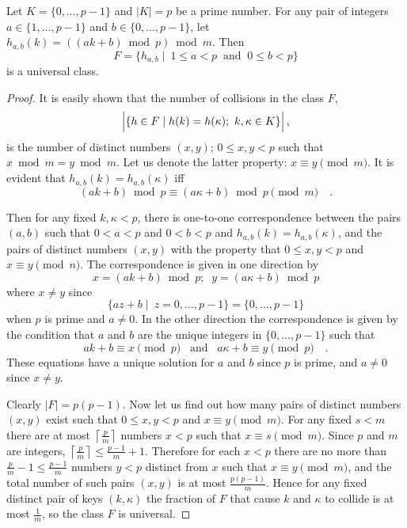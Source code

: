 \begin{Theorem} 
\label{the:ucf}
Let \({K}=\{0,\ldots,p-1\}\) and \(|{K}| = p\) be
a prime number. 
For any pair of integers \(a \in \{1, \ldots, p-1\}\)
and \(b \in \{0, \ldots, p-1\}\), let
\(
h_{a,b}(k) = \left ( (ak + b) \bmod p \right ) \bmod m
\).
Then
\[
{F} = \{h_{a,b} \mid \ 1 \le a < p \;\; \mathrm{and} \;\; 0 \le b < p \}
\]
is a universal class.
\end{Theorem}
\begin{proof}
It is easily shown that the number of collisions in the
class \({F}\), 
\[
\left| \raisebox{10pt}{} \{h\in {F} \mid  h(k)= h(\kappa); \ k,\kappa\in {K}\}\right|,
\]
is the number of distinct numbers \((x,y)\);
\(0 \le x,y < p\) such that 
\(x \bmod m = y \bmod m\). Let us denote the latter property: 
\(x \equiv y \pmod m\). %
It is evident that \(h_{a,b}(k) = h_{a,b}(\kappa)\) iff 
\[
(ak + b ) \bmod p  \equiv 
(a\kappa + b ) \bmod p  \pmod m \quad .
\]

Then for any fixed \(k, \kappa < p\), there is one-to-one
correspondence between the pairs \((a,b)\) such that
\(0 < a < p\) and \(0 < b < p\) and \(h_{a,b}(k) = h_{a,b}(\kappa)\),
and the pairs of distinct numbers \((x,y)\) with the
property that \(0 \le x,y < p\) and \(x \equiv y \pmod n\).
The correspondence is given in one direction by
\[
x = (ak + b) \bmod p; \;\; y = (a\kappa + b) \bmod p
\]
where \(x \ne y\) since 
\[
\{ az + b \mid \ z = 0, \ldots, p-1\} = \{0, \ldots, p-1\}
\]
when \(p\) is prime and \(a \ne 0\). In the other direction
the correspondence is given by the condition that \(a\) and
\(b\) are the unique integers in \(\{0, \ldots, p-1\}\) such
that
\[
ak + b \equiv x \pmod p \; \;\;\mathrm{and}\;\;\;
a\kappa + b \equiv y \pmod p \quad .
\]
These equations have a unique solution for \(a\) and \(b\)
since \(p\) is prime, and \(a \ne 0\) since \(x \ne y\).

Clearly \(|{F}| = p(p-1)\). Now let us find out how many 
pairs of distinct numbers
\((x,y)\) exist such that \(0 \le x,y < p\) and 
\(x \equiv y \pmod m\). For any fixed \(s < m\) there are
at most \( \left \lceil \frac{p}{m} \right \rceil \) numbers
\(x < p\) such that \(x \equiv s \pmod m\). Since \(p\) and
\(m\) are integers,
\(
\left \lceil \frac{p}{m} \right \rceil \le \frac{p-1}{m} +1
\).
Therefore for each \(x < p\) there are no more than
\(\frac{p}{m} -1 \le \frac{p-1}{m}\) numbers \(y < p\)
distinct from \(x\) such that \(x \equiv y \pmod m\), and
the total number of such pairs \((x,y)\) is at most 
\(\frac{p(p-1)}{m}\). Hence for any fixed distinct
pair of keys \((k,\kappa)\) the fraction of \({F}\)
that cause \(k\) and \(\kappa\) to collide is at
most \(\frac{1}{m}\), so the class \({F}\) is universal.
\end{proof}

